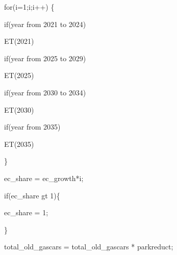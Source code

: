 \documentclass[a4paper, 11pt]{article}
\begin{document}
        \vspace*{3mm}
    
    for(i=1;i;i++)
    \{
    
        \vspace*{1mm}
    
        \quad if(year from 2021 to 2024)
        
        \vspace*{1mm}
        
            \quad \quad ET(2021)
            
        \vspace*{1mm}
        
        \quad if(year from 2025 to 2029)
        
        \vspace*{1mm}
        
            \quad \quad ET(2025)
            
        \vspace*{1mm}
        
        \quad if(year from 2030 to 2034)
        
        \vspace*{1mm}
        
            \quad \quad ET(2030)
            
        \vspace*{1mm}
        
        \quad if(year from 2035)
        
        \vspace*{1mm}
        
            \quad \quad ET(2035)
            
        \vspace*{1mm}
      \}

        ec\_share = ec\_growth*i;
        
        \vspace*{1mm}
        
        if(ec\_share gt 1)\{
        
        \vspace*{1mm}
        
            \quad ec\_share = 1;    
        
        \vspace*{1mm}
        \}

        total\_old\_gascars = total\_old\_gascars * parkreduct;
        
        \vspace*{1mm}
        
\end{document}
